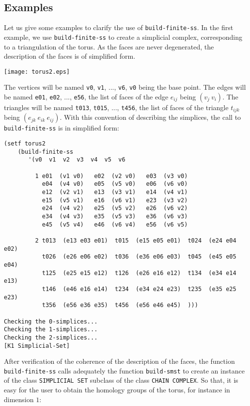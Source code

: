 \subsection* {Examples}
Let us give some examples to clarify the use of {\tt build-finite-ss}. In the first example,
we use  {\tt build-finite-ss} to create a simplicial complex, cor\-res\-pon\-ding to a
triangulation of the torus. As the faces are never degenerated, the description of the faces
is of simplified form.
%
\vskip 0.40cm
\centerline{\texttt{[image: torus2.eps]}}
\vskip 0.40cm
%
The vertices will be named {\tt v0}, {\tt v1}, ..., {\tt v6}, {\tt v0} being the base point. The edges
will be named {\tt e01}, {\tt e02}, ...,  {\tt e56}, the list of faces of the edge $e_{ij}$ being
$(v_j\  v_i)$. The triangles will be named {\tt t013}, {\tt t015}, ..., {\tt t456}, the list of faces of
the triangle $t_{ijk}$ being $(e_{jk}\  e_{ik}\  e_{ij})$.
With this convention of describing the simplices, the call to {\tt build-finite-ss} is in simplified form:
{\footnotesize\begin{verbatim}
(setf torus2
    (build-finite-ss
       '(v0  v1  v2  v3  v4  v5  v6

         1 e01  (v1 v0)   e02  (v2 v0)   e03  (v3 v0)
           e04  (v4 v0)   e05  (v5 v0)   e06  (v6 v0)
           e12  (v2 v1)   e13  (v3 v1)   e14  (v4 v1)
           e15  (v5 v1)   e16  (v6 v1)   e23  (v3 v2)
           e24  (v4 v2)   e25  (v5 v2)   e26  (v6 v2)
           e34  (v4 v3)   e35  (v5 v3)   e36  (v6 v3)
           e45  (v5 v4)   e46  (v6 v4)   e56  (v6 v5)

         2 t013  (e13 e03 e01)  t015  (e15 e05 e01)  t024  (e24 e04 e02)
           t026  (e26 e06 e02)  t036  (e36 e06 e03)  t045  (e45 e05 e04)
           t125  (e25 e15 e12)  t126  (e26 e16 e12)  t134  (e34 e14 e13)
           t146  (e46 e16 e14)  t234  (e34 e24 e23)  t235  (e35 e25 e23)
           t356  (e56 e36 e35)  t456  (e56 e46 e45)  )))

Checking the 0-simplices...
Checking the 1-simplices...
Checking the 2-simplices...
[K1 Simplicial-Set]
\end{verbatim}}
After verification of the coherence of the description of the faces, the function
{\tt build-finite-ss} calls adequately the function {\tt build-smst} to create an instance
of the class {\tt SIMPLICIAL SET} subclass of the class {\tt CHAIN COMPLEX}. So that, it is easy for
the user  to obtain the homology groups of the torus, for instance in dimension $1$:

